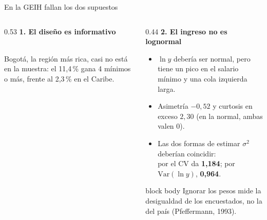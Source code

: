 \documentclass[aspectratio=169,11pt]{beamer}
\newenvironment{caja}{\begin{beamercolorbox}[sep=5pt]{block body}}{\end{beamercolorbox}}
\begin{document}
\begin{frame}{En la GEIH fallan los dos supuestos}
  \begin{columns}[T]
    \begin{column}{0.53\textwidth}
      \centering
      {\small\textbf{1. El diseño es informativo}}\\[0.1cm]
      \\
      \footnotesize Bogotá, la región más rica, casi no está en la muestra: el 11,4\,\% gana 4 mínimos o más, frente al 2,3\,\% en el Caribe.
    \end{column}
    \begin{column}{0.44\textwidth}
      {\small\textbf{2. El ingreso no es lognormal}}
      \begin{itemize}
        \small
        \item $\ln y$ debería ser normal, pero tiene un pico en el salario mínimo y una cola izquierda larga.
        \item Asimetría $-0{,}52$ y curtosis en exceso $2{,}30$ (en la normal, ambas valen 0).
        \item Las dos formas de estimar $\sigma^2$ deberían coincidir:\\
              por el CV da \textbf{1,184}; por $\mathrm{Var}(\ln y)$, \textbf{0,964}.
      \end{itemize}
      \vspace{0.2cm}
      \begin{caja}
        \footnotesize Ignorar los pesos mide la desigualdad de los encuestados, no la del país (Pfeffermann, 1993).
      \end{caja}
    \end{column}
  \end{columns}
\end{frame}
\end{document}
